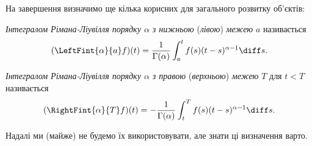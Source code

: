 На завершення визначимо ще кілька корисних для загального розвитку об'єктів:
\begin{definition}
    \textit{Інтегралом Рімана-Ліувілля порядку $\alpha$ з нижньою }(\textit{лівою})\textit{ межею} $a$ називається
    \begin{equation}
        (\LeftFint{\alpha}{a} f)(t) = \frac{1}{\Gamma(\alpha)} \int_a^t f(s) (t - s)^{\alpha - 1} \diff s.
    \end{equation}
\end{definition}

\begin{definition}
    \textit{Інтегралом Рімана-Ліувілля порядку $\alpha$ з правою }(\textit{верхньою})\textit{ межею} $T$ для $t < T$ називається
    \begin{equation}
        (\RightFint{\alpha}{T} f)(t) = -\frac{1}{\Gamma(\alpha)} \int_t^T f(s) (t - s)^{\alpha - 1} \diff s.
    \end{equation}
\end{definition}

Надалі ми (майже) не будемо їх використовувати, але знати ці визначення варто.

